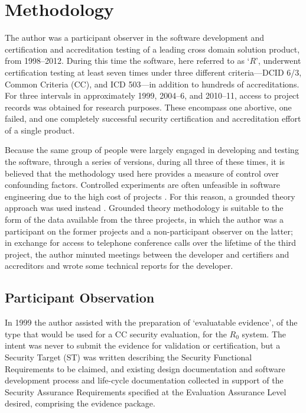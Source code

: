 \documentclass[10pt,letterpaper,conference]{IEEEtran}
\begin{document}
\section{Methodology}\label{section:methodology}

The author was a participant observer in the software development and certification and
accreditation testing of a leading cross domain solution product, from 1998--2012. During this
time the software, here referred to as `$R$', underwent certification testing at least seven
times under three different
criteria---DCID 6/3, Common Criteria (CC), and ICD 503---in addition to hundreds of accreditations.
For three intervals in approximately 1999, 2004--6, and 2010--11, access to project records was
obtained for
research purposes. These encompass one abortive, one failed, and one completely successful security
certification and accreditation effort of a single product.

Because the same group of people were largely engaged in developing and testing the software,
through a series of versions, during all three of these times, it is believed that the
methodology used here provides a measure of control over confounding factors. Controlled
experiments are often unfeasible in software engineering due to the high cost of projects
\cite{McCue1978,Rost2011}. For this reason, a grounded theory approach was used instead
\cite{Glaser1967}.
Grounded theory methodology is suitable to the form of the data available from the three projects,
in which the author was a participant on the former projects and a non-participant observer on the
latter; in exchange for access to telephone conference calls over the lifetime of the third project,
the author minuted meetings between the developer and certifiers and accreditors and wrote some
technical reports for the developer.

\subsection{Participant Observation}

In 1999 the author assisted with the preparation of `evaluatable evidence', of the type that would
be used for a CC security evaluation, for the $R_0$ system. The intent was never to submit the
evidence for validation or certification, but a Security Target (ST) was written describing
the Security Functional Requirements to be claimed, and existing design documentation and software
development process and life-cycle documentation collected in support of the Security Assurance
Requirements specified at the Evaluation Assurance Level desired, comprising the evidence package.
\end{document}
